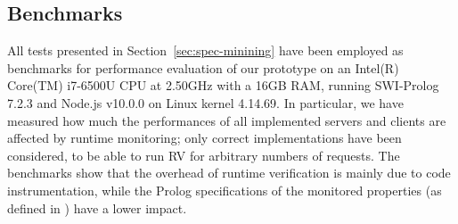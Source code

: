 \subsection{Benchmarks}
All tests presented in Section~\ref{sec:spec-minining} have been employed as benchmarks for performance evaluation
of our prototype on an Intel(R) Core(TM) i7-6500U CPU at 2.50GHz with a 16GB RAM, running SWI-Prolog 7.2.3 and Node.js v10.0.0 on
Linux kernel 4.14.69.
In particular, we have measured how much the performances of all implemented servers and clients are affected by runtime monitoring;
only correct implementations have been considered, to be able to run RV for arbitrary numbers of requests.
The benchmarks show that the overhead of runtime verification is mainly due to code instrumentation, while the Prolog specifications of the monitored properties (as defined in ) have a lower impact.

